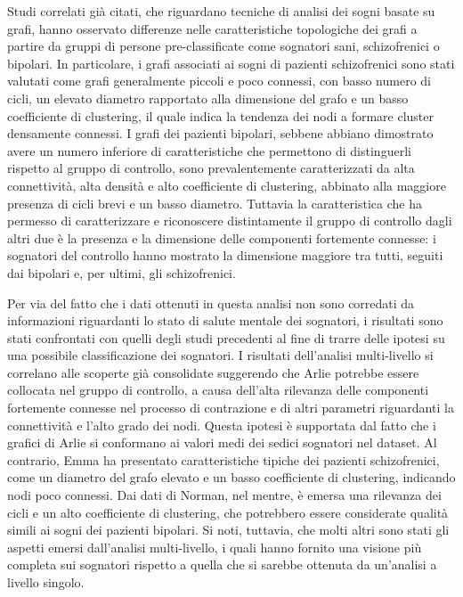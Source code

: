 Studi correlati già citati, che riguardano tecniche di analisi dei sogni basate su grafi, hanno osservato differenze
nelle caratteristiche topologiche dei grafi a partire da gruppi di persone pre-classificate come sognatori sani,
schizofrenici o bipolari.
In particolare, i grafi associati ai sogni di pazienti schizofrenici sono stati valutati come grafi generalmente
piccoli e poco connessi, con basso numero di cicli, un elevato diametro rapportato alla dimensione del grafo e un
basso coefficiente di clustering, il quale indica la tendenza dei nodi a formare cluster densamente connessi.
I grafi dei pazienti bipolari, sebbene abbiano dimostrato avere un numero inferiore di caratteristiche che permettono
di distinguerli rispetto al gruppo di controllo, sono prevalentemente caratterizzati da alta connettività, alta densità
e alto coefficiente di clustering, abbinato alla maggiore presenza di cicli brevi e un basso diametro.
Tuttavia la caratteristica che ha permesso di caratterizzare e riconoscere distintamente il gruppo di controllo
dagli altri due è la presenza e la dimensione delle componenti fortemente connesse: i sognatori del controllo hanno
mostrato la dimensione maggiore tra tutti, seguiti dai bipolari e, per ultimi, gli schizofrenici. \newline

Per via del fatto che i dati ottenuti in questa analisi non sono corredati da informazioni riguardanti lo stato di
salute mentale dei sognatori, i risultati sono stati confrontati con quelli degli studi precedenti al fine
di trarre delle ipotesi su una possibile classificazione dei sognatori.
I risultati dell'analisi multi-livello si correlano alle scoperte già consolidate suggerendo che Arlie potrebbe essere
collocata nel gruppo di controllo, a causa dell'alta rilevanza delle componenti fortemente connesse nel processo di
contrazione e di altri parametri riguardanti la connettività e l'alto grado dei nodi.
Questa ipotesi è supportata dal fatto che i grafici di Arlie si conformano ai valori medi dei sedici sognatori nel
dataset.
Al contrario, Emma ha presentato caratteristiche tipiche dei pazienti schizofrenici, come un diametro del grafo
elevato e un basso coefficiente di clustering, indicando nodi poco connessi.
Dai dati di Norman, nel mentre, è emersa una rilevanza dei cicli e un alto coefficiente di clustering, che potrebbero
essere considerate qualità simili ai sogni dei pazienti bipolari.
Si noti, tuttavia, che molti altri sono stati gli aspetti emersi dall'analisi multi-livello, i quali hanno fornito una
visione più completa sui sognatori rispetto a quella che si sarebbe ottenuta da un'analisi a livello singolo.


